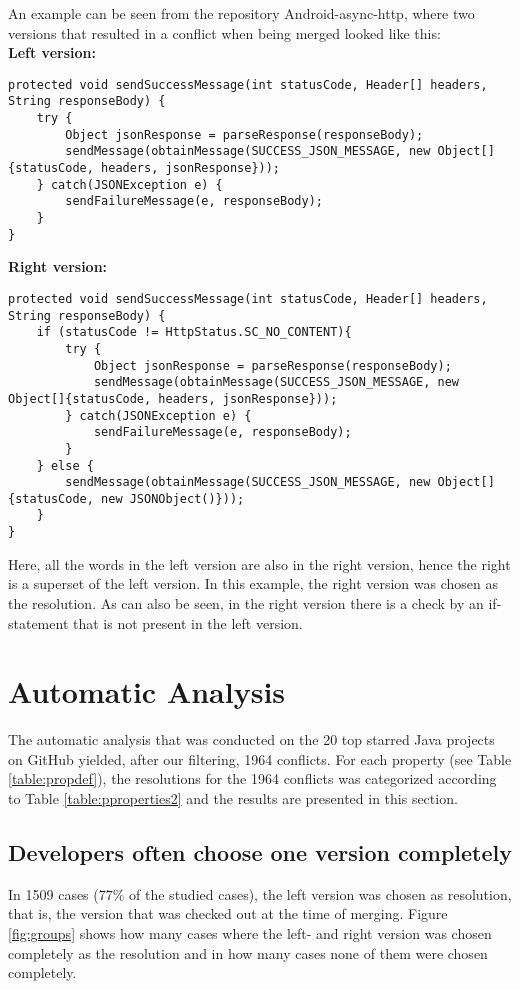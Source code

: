 An example can be seen from the repository Android-async-http, where two versions that resulted in a conflict when being merged looked like this:\\
\textbf{Left version:}
\lstset{language=Java,numbers=left,xleftmargin=2em,frame=single,framexleftmargin=1.5em}
\begin{lstlisting}[frame=single,breaklines=true,tabsize=2]
protected void sendSuccessMessage(int statusCode, Header[] headers, String responseBody) {
	try {
		Object jsonResponse = parseResponse(responseBody);
		sendMessage(obtainMessage(SUCCESS_JSON_MESSAGE, new Object[]{statusCode, headers, jsonResponse}));
	} catch(JSONException e) {
		sendFailureMessage(e, responseBody);
	}
}
\end{lstlisting}
\textbf{Right version:}
\lstset{language=Java,numbers=left,xleftmargin=2em,frame=single,framexleftmargin=1.5em}
\begin{lstlisting}[frame=single,breaklines=true,tabsize=2]
protected void sendSuccessMessage(int statusCode, Header[] headers, String responseBody) {
	if (statusCode != HttpStatus.SC_NO_CONTENT){
		try {
			Object jsonResponse = parseResponse(responseBody);
			sendMessage(obtainMessage(SUCCESS_JSON_MESSAGE, new Object[]{statusCode, headers, jsonResponse}));
		} catch(JSONException e) {
			sendFailureMessage(e, responseBody);
		}
	} else {
		sendMessage(obtainMessage(SUCCESS_JSON_MESSAGE, new Object[]{statusCode, new JSONObject()}));
	}
}
\end{lstlisting}
Here, all the words in the left version are also in the right version, hence the right is a superset of the left version. In this example, the right version was chosen as the resolution. As can also be seen, in the right version there is a check by an if-statement that is not present in the left version.
\FloatBarrier
\section{Automatic Analysis}
\FloatBarrier
The automatic analysis that was conducted on the 20 top starred Java projects on GitHub yielded, after our filtering, 1964 conflicts. For each property (see Table \ref{table:propdef}), the resolutions for the 1964 conflicts was categorized according to Table \ref{table:pproperties2} and the results are presented in this section.
\subsection{Developers often choose one version completely}
\FloatBarrier
In 1509 cases (77\% of the studied cases), the left version was chosen as resolution, that is, the version that was checked out at the time of merging. Figure \ref{fig:groups} shows how many cases where the left- and right version was chosen completely as the resolution and in how many cases none of them were chosen completely.

